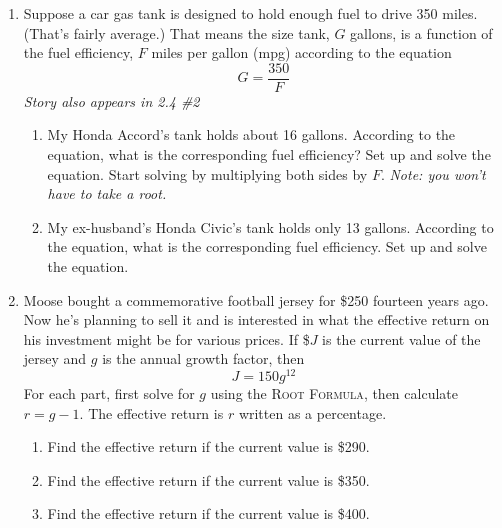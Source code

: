 \begin{enumerate}
\newpage %

\item Suppose a car gas tank is designed to hold enough fuel to drive 350 miles. (That's fairly average.)  That means the size tank, $G$ gallons, is a function of the fuel efficiency, $F$ miles per gallon (mpg) according to the equation  $$G = \frac{350}{F}$$
 \hfill \emph{Story also appears in 2.4 \#2}

\begin{enumerate}
\item My Honda Accord's tank holds about 16 gallons.  According to the equation, what is the corresponding fuel efficiency?  Set up and solve the equation.  Start solving by multiplying both sides by $F$.  \emph{Note: you won't have to take a root.} \vfill
\item My ex-husband's Honda Civic's tank holds only 13 gallons.  According to the equation, what is the corresponding fuel efficiency. Set up and solve the equation. \vfill
\end{enumerate}  

\newpage %

\item Moose bought a commemorative football jersey for \$250 fourteen years ago.  Now he's planning to sell it and is interested in what the effective return on his investment might be for various prices. If  \$$J$ is the current value of the jersey and $g$ is the annual growth factor, then
 $$J=150g^{12}$$
 For each part, first solve for $g$ using the \textsc{Root Formula}, then calculate $r=g-1$.  The effective return is $r$ written as a percentage.
\begin{enumerate}
\item Find the effective return if the current value is \$290. \vfill
\item Find the effective return if the current value is \$350. \vfill
\item Find the effective return if the current value is \$400. \vfill
\end{enumerate}

\end{enumerate}

